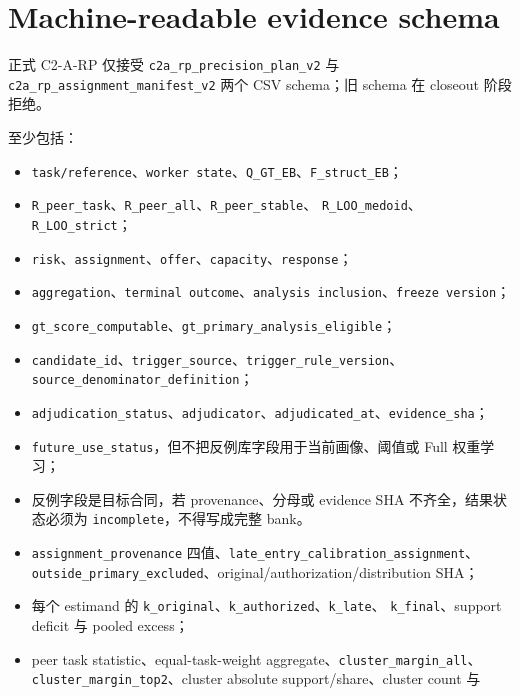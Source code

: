 \section{Machine-readable evidence schema}

正式 C2-A-RP 仅接受 \texttt{c2a\_rp\_precision\_plan\_v2} 与 \texttt{c2a\_rp\_assignment\_manifest\_v2} 两个 CSV schema；旧 schema 在 closeout 阶段拒绝。

至少包括：
\begin{itemize}
  \item \texttt{task/reference}、\texttt{worker state}、\texttt{Q\_GT\_EB}、\texttt{F\_struct\_EB}；
  \item \texttt{R\_peer\_task}、\texttt{R\_peer\_all}、\texttt{R\_peer\_stable}、
  \texttt{R\_LOO\_medoid}、\texttt{R\_LOO\_strict}；
  \item \texttt{risk}、\texttt{assignment}、\texttt{offer}、\texttt{capacity}、\texttt{response}；
  \item \texttt{aggregation}、\texttt{terminal outcome}、\texttt{analysis inclusion}、\texttt{freeze version}；
  \item \texttt{gt\_score\_computable}、\texttt{gt\_primary\_analysis\_eligible}；
  \item \texttt{candidate\_id}、\texttt{trigger\_source}、\texttt{trigger\_rule\_version}、\texttt{source\_denominator\_definition}；
  \item \texttt{adjudication\_status}、\texttt{adjudicator}、\texttt{adjudicated\_at}、\texttt{evidence\_sha}；
  \item \texttt{future\_use\_status}，但不把反例库字段用于当前画像、阈值或 Full 权重学习；
  \item 反例字段是目标合同，若 provenance、分母或 evidence SHA 不齐全，结果状态必须为
  \texttt{incomplete}，不得写成完整 bank。
  \item \texttt{assignment\_provenance} 四值、\texttt{late\_entry\_calibration\_assignment}、
  \texttt{outside\_primary\_excluded}、original/authorization/distribution SHA；
  \item 每个 estimand 的 \texttt{k\_original}、\texttt{k\_authorized}、\texttt{k\_late}、
  \texttt{k\_final}、support deficit 与 pooled excess；
  \item peer task statistic、equal-task-weight aggregate、\texttt{cluster\_margin\_all}、
  \texttt{cluster\_margin\_top2}、cluster absolute support/share、cluster count 与

\end{itemize}
